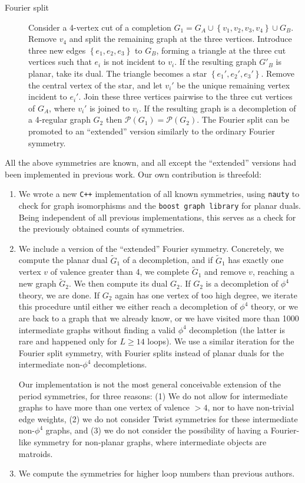 \documentclass[11pt,a4paper]{article}
\newcommand{\period}{\mathcal P}
\renewcommand{\|}{\rule[-0.4ex]{0.2ex}{1.2em}}
\begin{document}
\begin{description}
	\item[Fourier split] \cite{hu_further_2022} Consider a 4-vertex cut  of a completion $G_1=G_A \cup \left \lbrace v_1,v_2,v_3,v_4 \right \rbrace \cup G_B$.  Remove $v_4$ and split the remaining graph at the three vertices.   Introduce three new edges $\left \lbrace e_1,e_2,e_3 \right \rbrace   $ to $G_B$, forming a triangle at the three cut vertices such that $e_i$ is not incident to $v_i$. If the resulting graph $G'_B$ is planar, take its dual. The triangle becomes a star $\left \lbrace e_1', e_2', e_3' \right \rbrace   $. Remove the central vertex of the star, and let $v_i'$ be the unique remaining vertex incident to $e_i'$.  Join these three vertices pairwise to the three cut vertices of $G_A$, where $v_i'$ is joined to $v_i$.  If the resulting graph is a decompletion of a 4-regular graph $G_2$ then $\period(G_1)=\period(G_2)$. The Fourier split can be promoted to an \enquote{extended} version similarly to the ordinary Fourier symmetry.
\end{description}

\noindent
All the above symmetries are known, and all except the \enquote{extended} versions had been implemented in previous work. Our own contribution is threefold:
\begin{enumerate}
	\item 	We wrote a new \texttt{C++} implementation of all known symmetries, using \texttt{nauty} \cite{mckay_practical_2014} to check for graph isomorphisms and the \texttt{boost graph library} \cite{siek_boost_2001} for planar duals. Being independent of all previous implementations, this serves as a check for the previously obtained counts of symmetries.
	\item We include a version of the \enquote{extended} Fourier symmetry. Concretely, we compute the planar dual $\tilde G_1$ of a decompletion, and if $\tilde G_1$ has exactly one vertex $v$ of valence greater than 4, we complete $\tilde G_1$ and remove $v$, reaching a new graph $\tilde G_2$. We then compute its dual $G_2$. If $G_2$ is a decompletion of $\phi^4$ theory, we are done. If $G_2$ again has one vertex of too high degree, we iterate this procedure until either we either reach a decompletion of $\phi^4$ theory, or  we are back to a graph that we already know, or we have visited more than 1000 intermediate graphs without finding a valid $\phi^4$ decompletion (the latter is rare and happened only for $L\geq 14$ loops). We use a similar iteration   for the Fourier split symmetry, with Fourier splits instead of planar duals for the intermediate non-$\phi^4$ decompletions.
	
	Our implementation is not the most general conceivable extension of the period symmetries, for three reasons: (1) We do not allow for intermediate graphs to have more than one vertex of valence $>4$, nor to have non-trivial edge weights, (2) we do not consider Twist symmetries for these intermediate non-$\phi^4$ graphs, and (3) we do not consider the possibility of having a Fourier-like symmetry for non-planar graphs, where intermediate objects are matroids. 
	\item We compute the symmetries for higher loop numbers than previous authors.
\end{enumerate}
\end{document}
